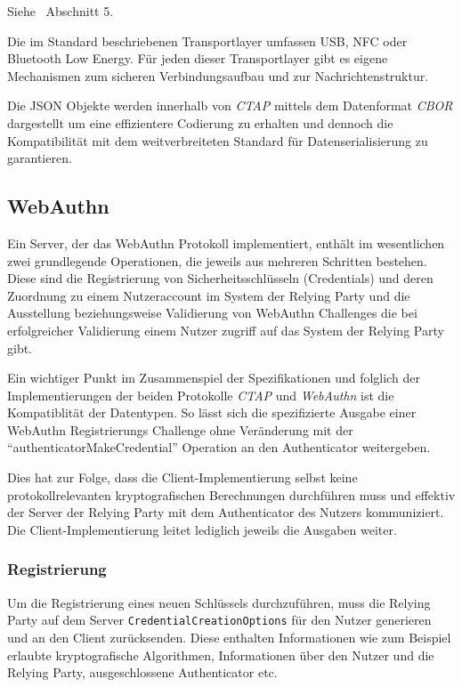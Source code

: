 \documentclass[journal]{IEEEtran}
\begin{document}
Siehe~\cite{ctapspec} Abschnitt 5.

Die im Standard beschriebenen Transportlayer umfassen USB, NFC oder Bluetooth
Low Energy. Für jeden dieser Transportlayer gibt es eigene Mechanismen zum
sicheren Verbindungsaufbau und zur Nachrichtenstruktur.~\cite{ctapspec}

Die JSON Objekte werden innerhalb von \textit{CTAP} mittels dem Datenformat
\textit{CBOR} dargestellt um eine effizientere Codierung zu erhalten und
dennoch die Kompatibilität mit dem weitverbreiteten Standard für
Datenserialisierung zu garantieren.~\cite{ctap, cborspec}

\subsection{WebAuthn}

Ein Server, der das WebAuthn Protokoll implementiert, enthält im wesentlichen
zwei grundlegende Operationen, die jeweils aus mehreren Schritten bestehen.
Diese sind die Registrierung von Sicherheitsschlüsseln (Credentials) und deren
Zuordnung zu einem Nutzeraccount im System der Relying Party und die
Ausstellung beziehungsweise Validierung von WebAuthn Challenges die bei
erfolgreicher Validierung einem Nutzer zugriff auf das System der Relying Party
gibt.

Ein wichtiger Punkt im Zusammenspiel der Spezifikationen und folglich der
Implementierungen der beiden Protokolle \textit{CTAP} und \textit{WebAuthn} ist
die Kompatiblität der Datentypen. So lässt sich die spezifizierte Ausgabe
einer WebAuthn Registrierungs Challenge ohne Veränderung mit der
``authenticatorMakeCredential'' Operation an den Authenticator
weitergeben.~\cite{ctapspec, webauthnspec}

Dies hat zur Folge, dass die Client-Implementierung selbst keine
protokollrelevanten kryptografischen Berechnungen durchführen muss und effektiv
der Server der Relying Party mit dem Authenticator des Nutzers kommuniziert.
Die Client-Implementierung leitet lediglich jeweils die Ausgaben
weiter.~\cite{webauthnspec}

\subsubsection{Registrierung}

Um die Registrierung eines neuen Schlüssels durchzuführen, muss die Relying
Party auf dem Server \texttt{CredentialCreationOptions} für den Nutzer
generieren und an den Client zurücksenden. Diese enthalten Informationen wie
zum Beispiel erlaubte kryptografische Algorithmen, Informationen über den
Nutzer und die Relying Party, ausgeschlossene Authenticator
etc.~\cite{webauthnspec}
\end{document}
